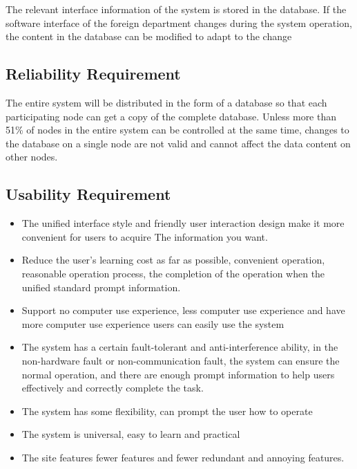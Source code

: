 \documentclass[16pt]{scrreprt}
\begin{document}
The relevant interface information of the system is stored in the database. If the software interface of the foreign department changes during the system operation, the content in the database can be modified to adapt to the change\\

\subsection{Reliability Requirement}
The entire system will be distributed in the form of a database so that each participating node can get a copy of the complete database.
Unless more than 51\% of nodes in the entire system can be controlled at the same time, changes to the database on a single node are not valid and cannot affect the data content on other nodes.

\subsection{Usability Requirement}
\begin{itemize}
    \item The unified interface style and friendly user interaction design make it more convenient for users to acquire
The information you want.
    \item Reduce the user's learning cost as far as possible, convenient operation, reasonable operation process, the completion of the operation when the unified standard prompt information.
    \item Support no computer use experience, less computer use experience and have more computer use experience users can easily use the system
    \item The system has a certain fault-tolerant and anti-interference ability, in the non-hardware fault or non-communication fault, the system can ensure the normal operation, and there are enough prompt information to help users effectively and correctly complete the task.
    \item The system has some flexibility, can prompt the user how to operate
    \item The system is universal, easy to learn and practical
    \item The site features fewer features and fewer redundant and annoying features.
\end{itemize}
\end{document}
